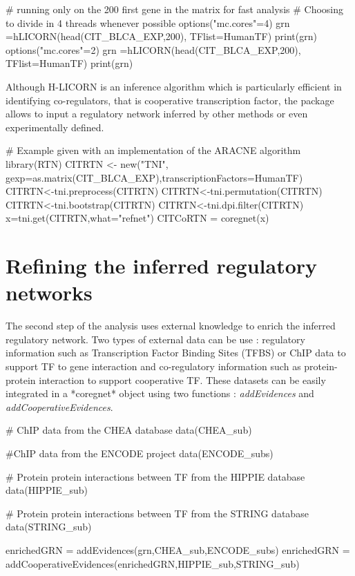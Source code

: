 \documentclass[12pt]{article}
\begin{document}
\begin{Schunk}
\begin{Sinput}
# running only on the 200 first gene in the matrix for fast analysis
    # Choosing to divide in 4 threads whenever possible
    options("mc.cores"=4)
    grn =hLICORN(head(CIT_BLCA_EXP,200), TFlist=HumanTF)
    print(grn)
    options("mc.cores"=2)
    grn =hLICORN(head(CIT_BLCA_EXP,200), TFlist=HumanTF)
    print(grn)
\end{Sinput}
\end{Schunk}

Although H-LICORN is an inference algorithm which is particularly
efficient in identifying co-regulators, that is cooperative
transcription factor, the package allows to input a regulatory network
inferred by other methods or even experimentally defined.


\begin{Schunk}
\begin{Sinput}
 # Example given with an implementation of the ARACNE algorithm
    library(RTN)
    CITRTN <- new("TNI", gexp=as.matrix(CIT_BLCA_EXP),transcriptionFactors=HumanTF)
    CITRTN<-tni.preprocess(CITRTN)
    CITRTN<-tni.permutation(CITRTN)
    CITRTN<-tni.bootstrap(CITRTN)
    CITRTN<-tni.dpi.filter(CITRTN)
    x=tni.get(CITRTN,what="refnet")
    CITCoRTN = coregnet(x)
\end{Sinput}
\end{Schunk}


\section{Refining the inferred regulatory networks}

The second step of the analysis uses external knowledge to enrich the
inferred regulatory network. Two types of external data can be use :
regulatory information such as Transcription Factor Binding Sites (TFBS)
or ChIP data to support TF to gene interaction and co-regulatory
information such as protein-protein interaction to support cooperative
TF. These datasets can be easily integrated in a *coregnet* object using
two functions : \textit{addEvidences} and \textit{addCooperativeEvidences}.

\begin{Schunk}
\begin{Sinput}
    # ChIP data from the CHEA database
    data(CHEA_sub)

    #ChIP data from the ENCODE project
    data(ENCODE_subs)

    # Protein protein interactions between TF from the HIPPIE database
    data(HIPPIE_sub)

    # Protein protein interactions between TF from the STRING database
    data(STRING_sub)

    enrichedGRN = addEvidences(grn,CHEA_sub,ENCODE_subs)
    enrichedGRN = addCooperativeEvidences(enrichedGRN,HIPPIE_sub,STRING_sub)

\end{Sinput}
\end{Schunk}
\end{document}
